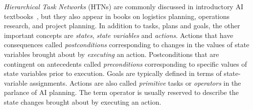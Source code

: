 \documentclass[letterpaper,11pt]{article}
\begin{document}
{\it{Hierarchical Task Networks}} (HTNs) are commonly discussed in introductory AI textbooks~\cite{RussellandNorvig03,Deanetal95}, but they also appear in books on logistics planning, operations research, and project planning. In addition to tasks, plans and goals, the other important concepts are {\it{states}}, {\it{state variables}} and {\it{actions}}. Actions that have consequences called {\it{postconditions}} corresponding to changes in the values of state variables brought about by {\it{executing}} an action. Postconditions that are contingent on antecedents called {\it{preconditions}} corresponding to specific values of state variables prior to execution. Goals are typically defined in terms of state-variable assignments. Actions are also called {\it{primitive}} tasks or {\it{operators}} in the parlance of AI planning. The term operator is usually reserved to describe the state changes brought about by executing an action. 
\end{document}
